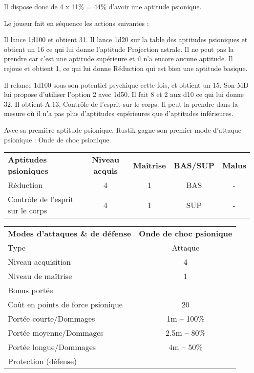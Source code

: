 \bigskip

Il dispose donc de 4 x 11\% = 44\% d'avoir une aptitude psionique.

\bigskip

Le joueur fait en séquence les actions suivantes :

\bigskip

Il lance 1d100 et obtient 31. Il lance 1d20 sur la table des aptitudes psioniques et obtient un 16 ce qui lui donne l'aptitude Projection astrale. Il ne peut pas la prendre car c'est une aptitude supérieure et il n'a encore aucune aptitude. Il rejoue et obtient 1, ce qui lui donne Réduction qui est bien une aptitude basique.

\bigskip

Il relance 1d100 sous son potentiel psychique cette fois, et obtient un 15. Son MD lui propose d'utiliser l'option 2 avec 1d50. Il fait 8 et 2 aux d10 ce qui lui donne 32. Il obtient A:13, Contrôle de l'esprit sur le corps. Il peut la prendre dans la mesure où il n'a pas plus d'aptitudes supérieures que d'aptitudes inférieures.

\bigskip

Avec sa première aptitude psionique, Rustik gagne son premier mode d'attaque psionique : Onde de choc psionique.

\bigskip

\begin{tabular}{lcccc}
\textbf{Aptitudes psioniques} & \textbf{Niveau acquis} & \textbf{Maîtrise}  & \textbf{BAS/SUP} & \textbf{Malus} \\
Réduction                         & 4 & 1 & BAS & - \\
Contrôle de l'esprit sur le corps & 4 & 1 & SUP & - \\
\end{tabular}

\bigskip

\begin{tabular}{lc}
\textbf{Modes d'attaques \& de défense} & \textbf{Onde de choc psionique} \\
Type                                & Attaque \\
Niveau acquisition                  & 4 \\
Niveau de maîtrise                  & 1 \\
Bonus portée                        & -- \\
Coût en points de force psionique   & 20 \\
Portée courte/Dommages              &   1m -- 100\% \\
Portée moyenne/Dommages             & 2.5m -- 80\% \\
Portée longue/Dommages              &   4m -- 50\%  \\
Protection (défense)                & -- \\
\end{tabular}

